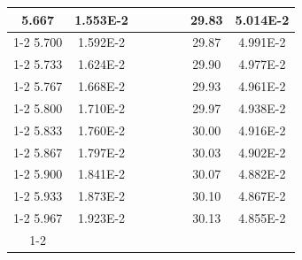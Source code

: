 \documentclass[article,12pt]{elsarticle}
\begin{document}
\begin{longtable}[c]{|c|c|cccccc}
5.667    & 1.553E-2  &                       &                              &                            & \multicolumn{1}{c|}{} & \multicolumn{1}{c|}{29.83}   & \multicolumn{1}{c|}{5.014E-2} \\ \cline{1-2} \cline{7-8} 
5.700    & 1.592E-2  &                       &                              &                            & \multicolumn{1}{c|}{} & \multicolumn{1}{c|}{29.87}   & \multicolumn{1}{c|}{4.991E-2} \\ \cline{1-2} \cline{7-8} 
5.733    & 1.624E-2  &                       &                              &                            & \multicolumn{1}{c|}{} & \multicolumn{1}{c|}{29.90}   & \multicolumn{1}{c|}{4.977E-2} \\ \cline{1-2} \cline{7-8} 
5.767    & 1.668E-2  &                       &                              &                            & \multicolumn{1}{c|}{} & \multicolumn{1}{c|}{29.93}   & \multicolumn{1}{c|}{4.961E-2} \\ \cline{1-2} \cline{7-8} 
5.800    & 1.710E-2  &                       &                              &                            & \multicolumn{1}{c|}{} & \multicolumn{1}{c|}{29.97}   & \multicolumn{1}{c|}{4.938E-2} \\ \cline{1-2} \cline{7-8} 
5.833    & 1.760E-2  &                       &                              &                            & \multicolumn{1}{c|}{} & \multicolumn{1}{c|}{30.00}   & \multicolumn{1}{c|}{4.916E-2} \\ \cline{1-2} \cline{7-8} 
5.867    & 1.797E-2  &                       &                              &                            & \multicolumn{1}{c|}{} & \multicolumn{1}{c|}{30.03}   & \multicolumn{1}{c|}{4.902E-2} \\ \cline{1-2} \cline{7-8} 
5.900    & 1.841E-2  &                       &                              &                            & \multicolumn{1}{c|}{} & \multicolumn{1}{c|}{30.07}   & \multicolumn{1}{c|}{4.882E-2} \\ \cline{1-2} \cline{7-8} 
5.933    & 1.873E-2  &                       &                              &                            & \multicolumn{1}{c|}{} & \multicolumn{1}{c|}{30.10}   & \multicolumn{1}{c|}{4.867E-2} \\ \cline{1-2} \cline{7-8} 
5.967    & 1.923E-2  &                       &                              &                            & \multicolumn{1}{c|}{} & \multicolumn{1}{c|}{30.13}   & \multicolumn{1}{c|}{4.855E-2} \\ \cline{1-2} \cline{7-8} 

\end{longtable}
\end{document}
